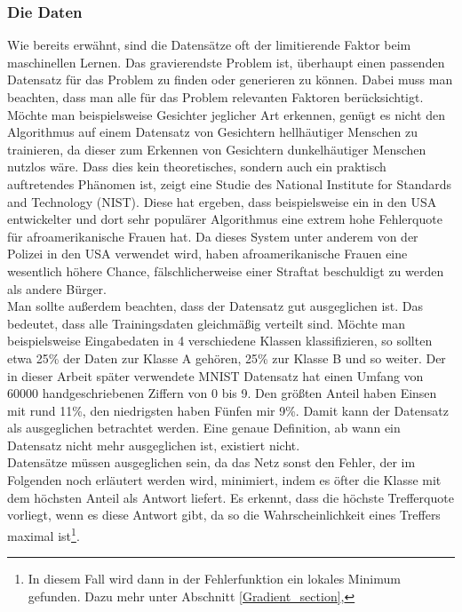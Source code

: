 \documentclass[11pt]{article}
\begin{document}
\subsubsection{Die Daten}
Wie bereits erwähnt, sind die Datensätze oft der limitierende Faktor beim maschinellen Lernen. Das gravierendste Problem ist, überhaupt einen passenden Datensatz für das Problem zu finden oder generieren zu können. Dabei muss man beachten, dass man alle für das Problem relevanten Faktoren berücksichtigt. Möchte man beispielsweise Gesichter jeglicher Art erkennen, genügt es nicht den Algorithmus auf einem Datensatz von Gesichtern hellhäutiger Menschen zu trainieren, da dieser zum Erkennen von Gesichtern dunkelhäutiger Menschen nutzlos wäre. Dass dies kein theoretisches, sondern auch ein praktisch auftretendes Phänomen ist, zeigt eine Studie des National Institute for Standards and Technology (NIST)\cite{5}. Diese hat ergeben, dass beispielsweise ein in den USA entwickelter und dort sehr populärer Algorithmus eine extrem hohe Fehlerquote für afroamerikanische Frauen hat. Da dieses System unter anderem von der Polizei in den USA verwendet wird, haben afroamerikanische Frauen eine wesentlich höhere Chance, fälschlicherweise einer Straftat beschuldigt zu werden als andere Bürger.\\
Man sollte außerdem beachten, dass der Datensatz gut ausgeglichen ist. Das bedeutet, dass alle Trainingsdaten gleichmäßig verteilt sind. Möchte man beispielsweise Eingabedaten in 4 verschiedene Klassen klassifizieren, so sollten etwa 25\% der Daten zur Klasse A gehören, 25\% zur Klasse B und so weiter. Der in dieser Arbeit später verwendete MNIST Datensatz hat einen Umfang von 60000 handgeschriebenen Ziffern von 0 bis 9. Den größten Anteil haben Einsen mit rund 11\%, den niedrigsten haben Fünfen mir 9\%. Damit kann der Datensatz als ausgeglichen betrachtet werden. Eine genaue Definition, ab wann ein Datensatz nicht mehr ausgeglichen ist, existiert nicht.\\
Datensätze müssen ausgeglichen sein, da das Netz sonst den Fehler, der im Folgenden noch erläutert werden wird, minimiert, indem es öfter die Klasse mit dem höchsten Anteil als Antwort liefert. Es erkennt, dass die höchste Trefferquote vorliegt, wenn es diese Antwort gibt, da so die Wahrscheinlichkeit eines Treffers maximal ist\footnote{In diesem Fall wird dann in der Fehlerfunktion ein lokales Minimum gefunden. Dazu mehr unter Abschnitt \ref{Gradient_section}, }.
\end{document}
